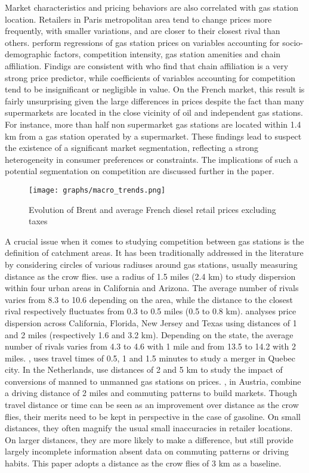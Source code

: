 \documentclass[english]{article}
\begin{document}
Market characteristics and pricing behaviors are also correlated with gas station location. Retailers in Paris metropolitan area tend to change prices more frequently, with smaller variations, and are closer to their closest rival than others. \cite{CHA16} perform regressions of gas station prices on variables accounting for socio-demographic factors, competition intensity, gas station amenities and chain affiliation. Findigs are consistent with \cite{HOS08} who find that chain affiliation is a very strong price predictor, while coefficients of variables accounting for competition tend to be insignificant or negligible in value. On the French market, this result is fairly unsurprising given the large differences in prices despite the fact than many supermarkets are located in the close vicinity of oil and independent gas stations. For instance, more than half non supermarket gas stations are located within 1.4 km from a gas station operated by a supermarket. These findings lead to suspect the existence of a significant market segmentation, reflecting a strong heterogeneity in consumer preferences or constraints. The implications of such a potential segmentation on competition are discussed further in the paper.

\begin{figure}%
    \caption{Evolution of Brent and average French diesel retail prices excluding taxes}
	\centering
		\texttt{[image: graphs/macro\_trends.png]}
\label{fig:brent_and_diesel}
\end{figure}

A crucial issue when it comes to studying competition between gas stations is the definition of catchment areas. It has been traditionally addressed in the literature by considering circles of various radiuses around gas stations, usually measuring distance as the crow flies. \cite{BAR04} use a radius of 1.5 miles (2.4 km) to study dispersion within four urban areas in California and Arizona. The average number of rivals varies from 8.3 to 10.6 depending on the area, while the distance to the closest rival respectively fluctuates from 0.3 to 0.5 miles (0.5 to 0.8 km). \cite{TAP11} analyses price dispersion across California, Florida, New Jersey and Texas using distances of 1 and 2 miles (respectively 1.6 and 3.2 km). Depending on the state, the average number of rivals varies from 4.3 to 4.6 with 1 mile and from 13.5 to 14.2 with 2 miles. \cite{HOU12}, uses travel times of 0.5, 1 and 1.5 minutes to study a merger in Quebec city. In the Netherlands, \cite{BRU15} use distances of 2 and 5 km to study the impact of conversions of manned to unmanned gas stations on prices. \cite{PEN15}, in Austria, combine a driving distance of 2 miles and commuting patterns to build markets.
Though travel distance or time can be seen as an improvement over distance as the crow flies, their merits need to be kept in perspective in the case of gasoline. On small distances, they often magnify the usual small inaccuracies in retailer locations. On larger distances, they are more likely to make a difference, but still provide largely incomplete information absent data on commuting patterns or driving habits. This paper adopts a distance as the crow flies of 3 km as a baseline.
\end{document}
